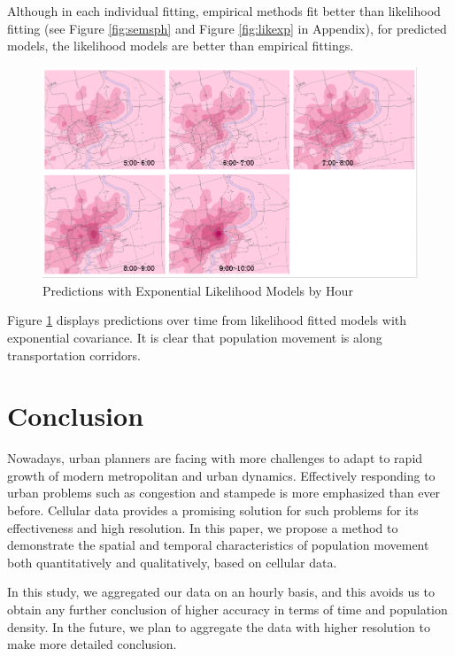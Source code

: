 \documentclass[hidelinks,12pt]{article}
\begin{document}
	 Although in each individual fitting, empirical methods fit better than likelihood fitting (see Figure \ref{fig:semsph} and Figure \ref{fig:likexp} in Appendix), for predicted models, the likelihood models are better than empirical fittings.
	 \begin{figure}[!ht]
	 	\includegraphics[width=\textwidth]{pred_exp.png}
	 	\caption{Predictions with Exponential Likelihood Models by Hour \label{fig:predexp}}
	 \end{figure}
 \FloatBarrier
 
	 Figure \ref{fig:predexp} displays predictions over time from likelihood fitted models with exponential covariance. It is clear that population movement is along transportation corridors.

	\section{Conclusion}\label{sec:con}
	Nowadays, urban planners are facing with more challenges to adapt to rapid growth of modern metropolitan and urban dynamics. Effectively responding to urban problems such as congestion and stampede is more emphasized than ever before. Cellular data provides a promising solution for such problems for its effectiveness and high resolution. In this paper, we propose a method to demonstrate the spatial and temporal characteristics of population movement both quantitatively and qualitatively, based on cellular data.
	
	In this study, we aggregated our data on an hourly basis, and this avoids us to obtain any further conclusion of higher accuracy in terms of time and population density. In the future, we plan to aggregate the data with higher resolution to make more detailed conclusion.
	
\end{document}
